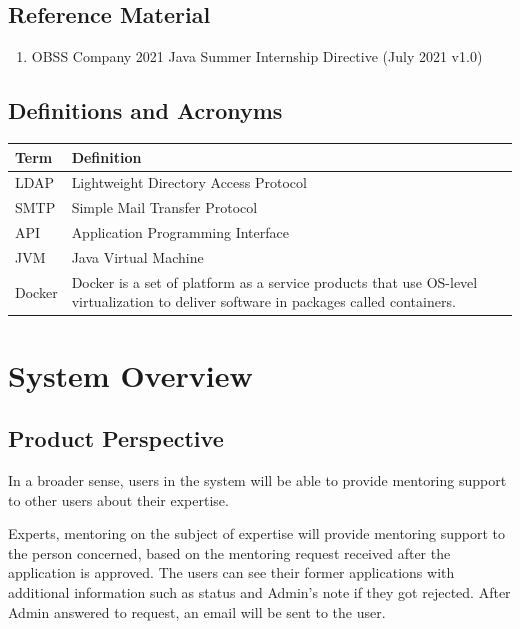 \documentclass[10pt]{article}
\begin{document}
\subsection{Reference Material} \label{reference_material}
\begin{enumerate}
    \item OBSS Company 2021 Java Summer Internship Directive (July 2021 v1.0)
\end{enumerate} 


\subsection{Definitions and Acronyms} \label{definitions_and_acronyms}
\begin{table}[h]
    \centering
    \begin{tabularx}{\textwidth}{|l|X|}
    \hline
    \textbf{Term} & \textbf{Definition} \\ \hline
    LDAP    &  Lightweight Directory Access Protocol    \\ \hline
    SMTP & Simple Mail Transfer Protocol \\ \hline
    API & Application Programming Interface \\ \hline
    JVM & Java Virtual Machine \\ \hline
    Docker & Docker is a set of platform as a service products that use OS-level virtualization to deliver software in packages called containers. \\ \hline
    \end{tabularx}
    \label{tab:terms}
\end{table}
\newpage


\section{System Overview} \label{system_overview}

\subsection{Product Perspective} \label{product_perspective}
In a broader sense, users in the system will be able to provide mentoring support to
other users about their expertise.

Experts, mentoring on the subject of expertise will provide mentoring support to the
person concerned, based on the mentoring request received after the application is
approved. The users can see their former applications with additional information 
such as status and Admin's note if they got rejected. After Admin answered to request,
an email will be sent to the user.
\end{document}
